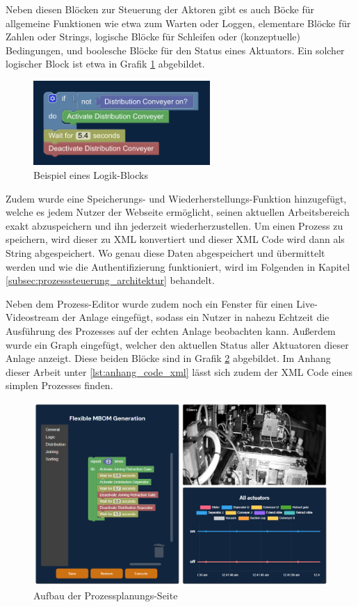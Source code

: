 Neben diesen Blöcken zur Steuerung der Aktoren gibt es auch Böcke für allgemeine Funktionen wie etwa zum Warten oder Loggen, elementare Blöcke für Zahlen oder Strings, logische Blöcke für Schleifen oder (konzeptuelle) Bedingungen, und boolesche Blöcke für den Status eines Aktuators. Ein solcher logischer Block ist etwa in Grafik \ref{fig:MBOMGen_Conditional} abgebildet.
%
\begin{figure}[htbp]
	\centering\includegraphics[width=0.6\textwidth]{images/04/MBOMGen_Conditional.pdf}
    \caption{Beispiel eines Logik-Blocks}
    \label{fig:MBOMGen_Conditional}
\end{figure}

Zudem wurde eine Speicherungs- und Wiederherstellungs-Funktion hinzugefügt, welche es jedem Nutzer der Webseite ermöglicht, seinen aktuellen Arbeitsbereich exakt abzuspeichern und ihn jederzeit wiederherzustellen. Um einen Prozess zu speichern, wird dieser zu XML konvertiert und dieser XML Code wird dann als String abgespeichert. Wo genau diese Daten abgespeichert und übermittelt werden und wie die Authentifizierung funktioniert, wird im Folgenden in Kapitel \ref{subsec:prozesssteuerung_architektur} behandelt.

Neben dem Prozess-Editor wurde zudem noch ein Fenster für einen Live-Videostream der Anlage eingefügt, sodass ein Nutzer in nahezu Echtzeit die Ausführung des Prozesses auf der echten Anlage beobachten kann. Außerdem wurde ein Graph eingefügt, welcher den aktuellen Status aller Aktuatoren dieser Anlage anzeigt. Diese beiden Blöcke sind in Grafik \ref{fig:MBOMGen_AllBlocks} abgebildet. Im Anhang dieser Arbeit unter \ref{lst:anhang_code_xml} lässt sich zudem der XML Code eines simplen Prozesses finden.
%
\begin{figure}[htbp]
	\centering\includegraphics[width=1.0\textwidth]{images/04/MBOMGen_AllBlocks.png}
    \caption{Aufbau der Prozessplanungs-Seite}
    \label{fig:MBOMGen_AllBlocks}
\end{figure}


